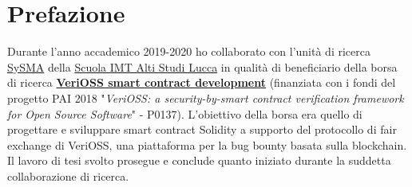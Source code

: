 \chapter*{Prefazione}

%
%
%
%

Durante l'anno accademico 2019-2020 ho collaborato con l'unità di ricerca \href{https://sysma.imtlucca.it/}{SySMA} della \href{https://www.imtlucca.it/it}{Scuola IMT Alti Studi Lucca} in qualità di beneficiario della borsa di ricerca \href{https://www.imtlucca.it/it/jobopportunity/verioss-smart-contract-development}{\textbf{VeriOSS smart contract development}} (finanziata con i fondi del progetto PAI 2018 "\textit{VeriOSS: a security-by-smart contract verification framework for Open Source Software}" - P0137). L'obiettivo della borsa era quello di progettare e sviluppare smart contract Solidity a supporto del protocollo di fair exchange di VeriOSS, una piattaforma per la bug bounty basata sulla blockchain. Il lavoro di tesi svolto prosegue e conclude quanto iniziato durante la suddetta collaborazione di ricerca.

